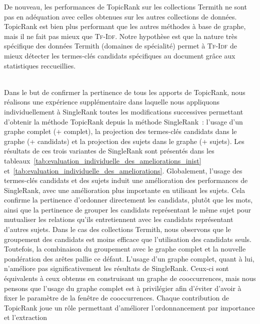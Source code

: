         De nouveau, les performances de TopicRank sur les collections Termith ne
        sont pas en adéquation avec celles obtenues sur les autres collections
        de données. TopicRank est bien plus performant que les autres méthodes à
        base de graphe, mais il ne fait pas mieux que \textsc{Tf-Idf}. Notre
        hypothèse est que la nature très spécifique des données Termith
        (domaines de spécialité) permet à \textsc{Tf-Idf} de mieux détecter les
        termes-clés candidats spécifiques au document grâce aux statistiques
        reccueillies.

        ~\\Dans le but de confirmer la pertinence de tous les apports de
        TopicRank, nous réalisons une expérience supplémentaire dans laquelle
        nous appliquons individuellement à SingleRank toutes les modifications
        successives permettant d'obtenir la méthode TopicRank depuis la méthode
        SingleRank~: l'usage d'un graphe complet (+ complet), la projection des
        termes-clés candidats dans le graphe (+ candidats) et la projection des
        sujets dans le graphe (+ sujets). Les résultats de ces trois variantes
        de SingleRank sont présentés dans les
        tableaux~\ref{tab:evaluation_individuelle_des_ameliorations_inist}
        et~\ref{tab:evaluation_individuelle_des_ameliorations}. Globalement,
        l'usage des termes-clés candidats et des sujets induit une amélioration
        des performances de SingleRank, avec une amélioration plus importante en
        utilisant les sujets. Cela confirme la pertinence d'ordonner directement
        les candidats, plutôt que les mots, ainsi que la pertinence de grouper
        les candidats représentant le même sujet pour mutualiser les relations
        qu'ils entretiennent avec les candidats représentant d'autres sujets.
        Dans le cas des collections Termith, nous observons que le groupement
        des candidats est moins efficace que l'utilisation des candidats seuls.
        Toutefois, la combinaison du groupement avec le graphe complet et la
        nouvelle pondération des arêtes pallie ce défaut. L'usage d'un graphe
        complet, quant à lui, n'améliore pas significativement les résultats de
        SingleRank. Ceux-ci sont équivalents à ceux obtenus en construisant un
        graphe de cooccurrences, mais nous pensons que l'usage du graphe complet
        est à privilégier afin d'éviter d'avoir à fixer le paramètre de la
        fenêtre de cooccurrences. Chaque contribution de TopicRank joue un rôle
        permettant d'améliorer l'ordonnancement par importance et l'extraction
